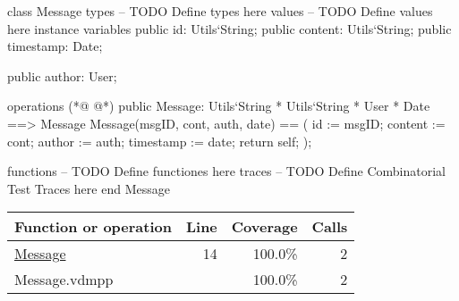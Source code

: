 \begin{vdmpp}[breaklines=true]
class Message
types
-- TODO Define types here
values
-- TODO Define values here
instance variables
 public id: Utils`String;
 public content: Utils`String;
 public timestamp: Date;

 public author: User;

operations
(*@
\label{Message:14}
@*)
 public Message:  Utils`String * Utils`String * User * Date ==> Message
 Message(msgID, cont, auth, date) == (
  id := msgID;
  content := cont;
  author := auth;
  timestamp := date;
  return self;
 );

functions
-- TODO Define functiones here
traces
-- TODO Define Combinatorial Test Traces here
end Message
\end{vdmpp}
\bigskip
\begin{longtable}{|l|r|r|r|}
\hline
Function or operation & Line & Coverage & Calls \\
\hline
\hline
\hyperref[Message:14]{Message} & 14&100.0\% & 2 \\
\hline
\hline
Message.vdmpp & & 100.0\% & 2 \\
\hline
\end{longtable}

